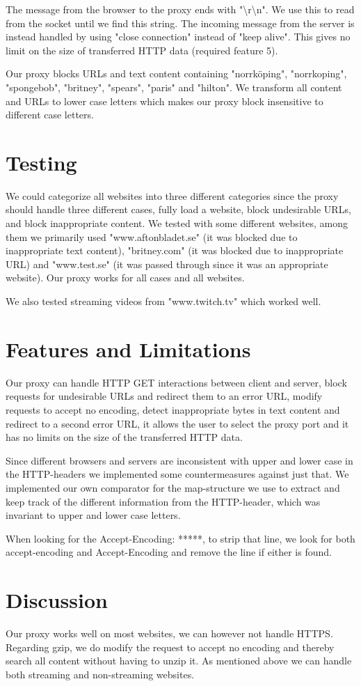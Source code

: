 \documentclass[10pt]{article}
\begin{document}
The message from the browser to the proxy ends with
"\textbackslash r\textbackslash n". We use this to read from the socket until
we find this string. The incoming message from the server is instead handled by
using "close connection" instead of "keep alive". This gives no limit on the
size of transferred HTTP data (required feature 5).

Our proxy blocks URLs and text content containing "norrk\"oping", "norrkoping",
"spongebob", "britney", "spears", "paris" and "hilton". We transform all content and
URLs to lower case letters which makes our proxy block insensitive to different
case letters.

\section{Testing}
We could categorize all websites into three different categories since the
proxy should handle three different cases, fully load a website,
block undesirable URLs, and block inappropriate content. We tested with some
different websites, among them we primarily used "www.aftonbladet.se"
(it was blocked due to inappropriate text content),
"britney.com" (it was blocked due to inappropriate URL) and "www.test.se" (it was passed through since
it was an appropriate website). Our proxy works for all cases and all websites.

We also tested streaming videos from "www.twitch.tv" which worked well.

\section{Features and Limitations}
Our proxy can handle HTTP GET interactions between client and server,
block requests for undesirable URLs and redirect them to an error URL,
modify requests to accept no encoding, detect inappropriate bytes in text
content and redirect to a second error URL, it allows the user to select the
proxy port and it has no limits on the size of the transferred HTTP data.

Since different browsers and servers are inconsistent with upper and lower case 
in the HTTP-headers we implemented some countermeasures against just that. 
We implemented our own comparator for the map-structure we use to extract and
 keep track of the different information from the HTTP-header, which was invariant 
 to upper and lower case letters. 
 
When looking for the Accept-Encoding: *****, to strip that line, we look for both  
accept-encoding and Accept-Encoding and remove the line if either is found.



\section{Discussion}
Our proxy works well on most websites, we can however not handle HTTPS.
Regarding gzip, we do modify the request to accept no encoding and thereby
search all content without having to unzip it. As mentioned above we can
handle both streaming and non-streaming websites.
\end{document}
